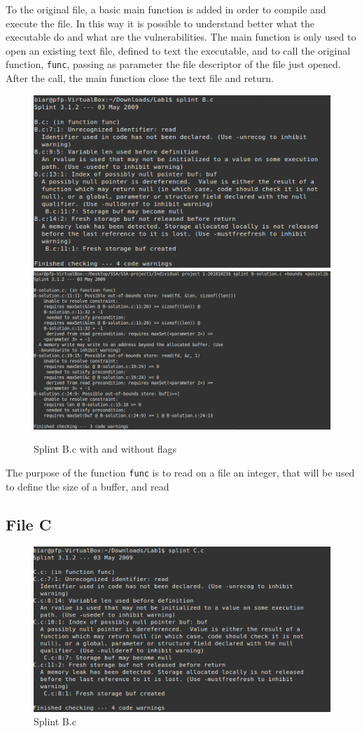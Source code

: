 \documentclass[a4paper]{article}
\begin{document}
To the original file, a basic main function is added in order to compile and 
execute the file. In this way it is possible to understand better what the 
executable do and what are the vulnerabilities. The main function is only used to 
open an existing text file, defined to text the executable, and to call the 
original function, \texttt{func}, passing as parameter the file descriptor of the 
file just opened. After the call, the main function close the text file and return.

\begin{figure}[h!]
    \centering
    \includegraphics[width=0.47\linewidth]{screen-B}\quad\includegraphics[width=0.47\linewidth]{B-bound}
    \caption{Splint B.c with and without flags}
\end{figure}

The purpose of the function \texttt{func} is to read on a file an integer, that 
will be used to define the size of a buffer, and read 

\subsection*{File C}
\begin{figure}[h!]
    \centering
    \includegraphics[width=0.6\linewidth]{screen-C}
    \caption{Splint B.c}
\end{figure}
\end{document}
